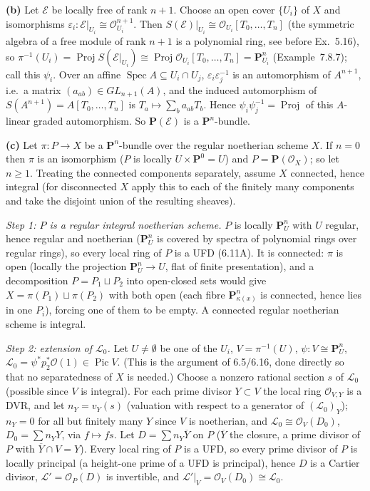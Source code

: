 \documentclass[11pt]{article}
\begin{document}
\textbf{(b)} Let $\mathcal E$ be locally free of rank $n+1$. Choose an open cover $\{U_i\}$ of $X$ and isomorphisms $\varepsilon_i:\mathcal E|_{U_i}\cong\mathcal O_{U_i}^{n+1}$. Then $S(\mathcal E)|_{U_i}\cong\mathcal O_{U_i}[T_0,\dots,T_n]$ (the symmetric algebra of a free module of rank $n+1$ is a polynomial ring, see before Ex.~5.16), so $\pi^{-1}(U_i)=\operatorname{Proj}S(\mathcal E|_{U_i})\cong\operatorname{Proj}\mathcal O_{U_i}[T_0,\dots,T_n]=\mathbf P^n_{U_i}$ (Example~7.8.7); call this $\psi_i$. Over an affine $\operatorname{Spec}A\subseteq U_i\cap U_j$, $\varepsilon_i\varepsilon_j^{-1}$ is an automorphism of $A^{n+1}$, i.e.\ a matrix $(a_{ab})\in GL_{n+1}(A)$, and the induced automorphism of $S(A^{n+1})=A[T_0,\dots,T_n]$ is $T_a\mapsto\sum_ba_{ab}T_b$. Hence $\psi_i\psi_j^{-1}=\operatorname{Proj}$ of this $A$-linear graded automorphism. So $\mathbf P(\mathcal E)$ is a $\mathbf P^n$-bundle.

\textbf{(c)} Let $\pi:P\to X$ be a $\mathbf P^n$-bundle over the regular noetherian scheme $X$. If $n=0$ then $\pi$ is an isomorphism ($P$ is locally $U\times\mathbf P^0=U$) and $P=\mathbf P(\mathcal O_X)$; so let $n\ge1$. Treating the connected components separately, assume $X$ connected, hence integral (for disconnected $X$ apply this to each of the finitely many components and take the disjoint union of the resulting sheaves).

\emph{Step 1: $P$ is a regular integral noetherian scheme.} $P$ is locally $\mathbf P^n_U$ with $U$ regular, hence regular and noetherian ($\mathbf P^n_U$ is covered by spectra of polynomial rings over regular rings), so every local ring of $P$ is a UFD (6.11A). It is connected: $\pi$ is open (locally the projection $\mathbf P^n_U\to U$, flat of finite presentation), and a decomposition $P=P_1\sqcup P_2$ into open-closed sets would give $X=\pi(P_1)\sqcup\pi(P_2)$ with both open (each fibre $\mathbf P^n_{\kappa(x)}$ is connected, hence lies in one $P_i$), forcing one of them to be empty. A connected regular noetherian scheme is integral.

\emph{Step 2: extension of $\mathcal L_0$.} Let $U\ne\emptyset$ be one of the $U_i$, $V=\pi^{-1}(U)$, $\psi:V\cong\mathbf P^n_U$, $\mathcal L_0=\psi^*p_2^*\mathcal O(1)\in\operatorname{Pic}V$. (This is the argument of 6.5/6.16, done directly so that no separatedness of $X$ is needed.) Choose a nonzero rational section $s$ of $\mathcal L_0$ (possible since $V$ is integral). For each prime divisor $Y\subset V$ the local ring $\mathcal O_{V,Y}$ is a DVR, and let $n_Y=v_Y(s)$ (valuation with respect to a generator of $(\mathcal L_0)_Y$); $n_Y=0$ for all but finitely many $Y$ since $V$ is noetherian, and $\mathcal L_0\cong\mathcal O_V(D_0)$, $D_0=\sum n_YY$, via $f\mapsto fs$. Let $D=\sum n_Y\overline Y$ on $P$ ($\overline Y$ the closure, a prime divisor of $P$ with $\overline Y\cap V=Y$). Every local ring of $P$ is a UFD, so every prime divisor of $P$ is locally principal (a height-one prime of a UFD is principal), hence $D$ is a Cartier divisor, $\mathcal L'=\mathcal O_P(D)$ is invertible, and $\mathcal L'|_V=\mathcal O_V(D_0)\cong\mathcal L_0$.
\end{document}
